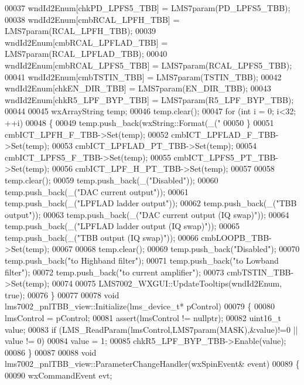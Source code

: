 \begin{DoxyCode}
00037     wndId2Enum[chkPD_LPFS5_TBB] = LMS7param(PD_LPFS5_TBB);
00038     wndId2Enum[cmbRCAL_LPFH_TBB] = LMS7param(RCAL_LPFH_TBB);
00039     wndId2Enum[cmbRCAL_LPFLAD_TBB] = LMS7param(RCAL_LPFLAD_TBB);
00040     wndId2Enum[cmbRCAL_LPFS5_TBB] = LMS7param(RCAL_LPFS5_TBB);
00041     wndId2Enum[cmbTSTIN_TBB] = LMS7param(TSTIN_TBB);
00042     wndId2Enum[chkEN_DIR_TBB] = LMS7param(EN_DIR_TBB);
00043     wndId2Enum[chkR5_LPF_BYP_TBB] = LMS7param(R5_LPF_BYP_TBB);
00044 
00045     wxArrayString temp;
00046     temp.clear();
00047     \textcolor{keywordflow}{for} (\textcolor{keywordtype}{int} i = 0; i<32; ++i)
00048     \{
00049         temp.push\_back(wxString::Format(\_(\textcolor{stringliteral}{"%
00050     \}
00051     cmbICT_LPFH_F_TBB->Set(temp);
00052     cmbICT_LPFLAD_F_TBB->Set(temp);
00053     cmbICT_LPFLAD_PT_TBB->Set(temp);
00054     cmbICT_LPFS5_F_TBB->Set(temp);
00055     cmbICT_LPFS5_PT_TBB->Set(temp);
00056     cmbICT_LPF_H_PT_TBB->Set(temp);
00057 
00058     temp.clear();
00059     temp.push\_back(\_(\textcolor{stringliteral}{"Disabled"}));
00060     temp.push\_back(\_(\textcolor{stringliteral}{"DAC current output"}));
00061     temp.push\_back(\_(\textcolor{stringliteral}{"LPFLAD ladder output"}));
00062     temp.push\_back(\_(\textcolor{stringliteral}{"TBB output"}));
00063     temp.push\_back(\_(\textcolor{stringliteral}{"DAC current output (IQ swap)"}));
00064     temp.push\_back(\_(\textcolor{stringliteral}{"LPFLAD ladder output (IQ swap)"}));
00065     temp.push\_back(\_(\textcolor{stringliteral}{"TBB output (IQ swap)"}));
00066     cmbLOOPB_TBB->Set(temp);
00067 
00068     temp.clear();
00069     temp.push\_back(\textcolor{stringliteral}{"Disabled"});
00070     temp.push\_back(\textcolor{stringliteral}{"to Highband filter"});
00071     temp.push\_back(\textcolor{stringliteral}{"to Lowband filter"});
00072     temp.push\_back(\textcolor{stringliteral}{"to current amplifier"});
00073     cmbTSTIN_TBB->Set(temp);
00074 
00075     LMS7002_WXGUI::UpdateTooltips(wndId2Enum, \textcolor{keyword}{true});
00076 \}
00077 
00078 \textcolor{keywordtype}{void} lms7002_pnlTBB_view::Initialize(lms_device_t* pControl)
00079 \{
00080     lmsControl = pControl;
00081     assert(lmsControl != \textcolor{keyword}{nullptr});
00082     uint16\_t value;
00083     \textcolor{keywordflow}{if} (LMS_ReadParam(lmsControl,LMS7param(MASK),&value)!=0  || value != 0)
00084         value = 1;
00085     chkR5_LPF_BYP_TBB->Enable(value);
00086 \}
00087 
00088 \textcolor{keywordtype}{void} lms7002_pnlTBB_view::ParameterChangeHandler(wxSpinEvent& event)
00089 \{
00090     wxCommandEvent evt;
}
\end{DoxyCode}
